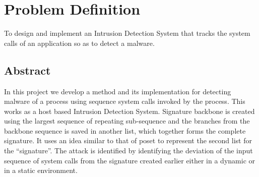 \chapter{Problem Definition}

\textsf{To design and implement an Intrusion Detection System that tracks the system calls of an application so as to detect a malware.} \\
\section{Abstract} 
\textsf{In this project we develop a method and its implementation for detecting malware of a process using sequence system calls invoked by the process. This works as a host based Intrusion Detection System. Signature backbone is created using the largest sequence of repeating sub-sequence and the branches from the backbone sequence is saved in another list, which together forms the complete signature. It uses an idea similar to that of poset to represent the second list for the “signature”. The attack is identified by identifying the deviation of the input sequence of system calls from the signature created earlier either in a dynamic or in a static environment.}
